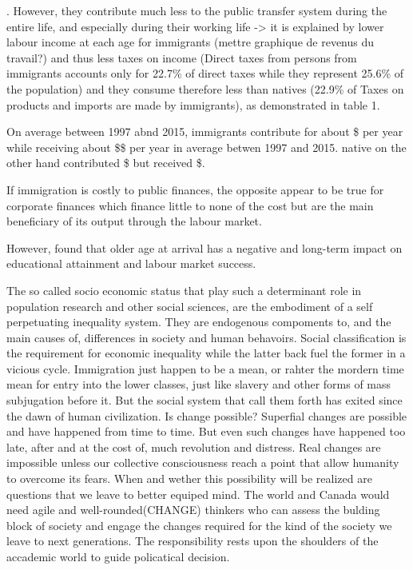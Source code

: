 .
However, they contribute much less to the public transfer system during the entire life, and especially during their working life -> it is explained by lower labour income at each age for immigrants (mettre graphique de revenus du travail?) and thus less taxes on income (Direct taxes from persons from immigrants accounts only for 22.7\% of direct taxes while they represent 25.6\% of the population) and they consume therefore less than natives (22.9\% of Taxes on products and imports are made by immigrants), as demonstrated in table 1.

On average between 1997 abnd 2015, immigrants contribute for about \$ per year while receiving about \$\$ per year in average betwen 1997 and 2015. native on the other hand contributed \$ but received \$.

If immigration is costly to public finances, the opposite appear to be true for corporate finances which finance little to none of the cost but are the main beneficiary of its output through the labour market.




However, \citet{Hermansen:2017ht} found that older age at arrival has a negative and long-term impact on educational attainment and labour market success.

\vspace{0.7em}\par
The so called socio economic status that play such a determinant role in population research and other social sciences, are the embodiment of a self perpetuating inequality system. They are endogenous compoments to, and the main causes of, differences in society and human behavoirs. Social classification is the requirement for economic inequality while the latter back fuel the former in a vicious cycle. Immigration just happen to be a mean, or rahter the mordern time mean for entry into the lower classes, just like slavery and other forms of mass subjugation before it. But the social system that call them forth has exited since the dawn of human civilization. Is change possible? Superfial changes are possible and have happened from time to time. But even such changes have happened too late, after and at the cost of, much revolution and distress. Real changes are impossible unless our collective consciousness reach a point that allow humanity to overcome its fears. When and wether this possibility will be realized are questions that we leave to better equiped mind. The world and Canada would need agile and well-rounded(CHANGE) thinkers who can assess the bulding block of society and engage the changes required for the kind of the society we leave to next generations. The responsibility rests upon the shoulders of the accademic world to guide policatical decision.





